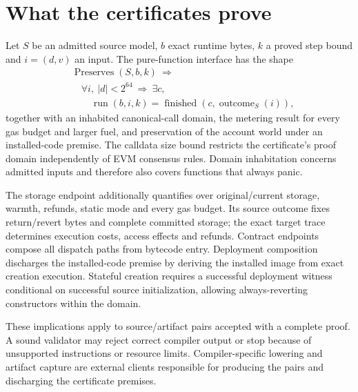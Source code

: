\documentclass[conference]{IEEEtran}
\begin{document}
\section{What the certificates prove}
Let $S$ be an admitted source model, $b$ exact runtime bytes, $k$ a proved
step bound and $i=(d,v)$ an input. The pure-function interface has the shape
\begin{align*}
 &\operatorname{Preserves}(S,b,k)\ \Longrightarrow\\
 &\quad\forall i,\ |d|<2^{64}\ \Longrightarrow\ \exists c,\\
 &\qquad\operatorname{run}(b,i,k)=
       \operatorname{finished}(c,\operatorname{outcome}_S(i)),
\end{align*}
together with an inhabited canonical-call domain, the metering result for
every gas budget and larger fuel, and preservation of the account world under
an installed-code premise. The calldata size bound restricts the certificate's
proof domain independently of EVM consensus rules. Domain inhabitation concerns
admitted inputs and therefore also covers functions that always panic.

The storage endpoint additionally quantifies over original/current storage,
warmth, refunds, static mode and every gas budget. Its source outcome fixes
return/revert bytes and complete committed storage; the exact target trace
determines execution costs, access effects and refunds. Contract endpoints
compose all dispatch paths from bytecode entry. Deployment composition discharges the
installed-code premise by deriving the installed image from exact creation
execution. Stateful creation requires a successful deployment witness
conditional on successful source initialization, allowing always-reverting
constructors within the domain.

These implications apply to source/artifact pairs accepted with a complete
proof. A sound validator may reject correct compiler output or stop because of
unsupported instructions or resource limits. Compiler-specific lowering and
artifact capture are external clients responsible for producing the pairs and
discharging the certificate premises.
\end{document}
